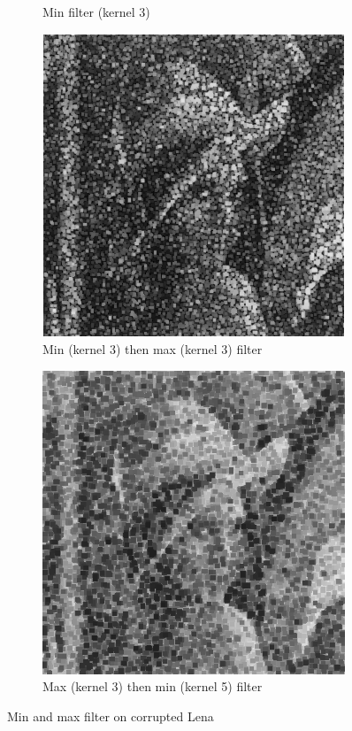 \documentclass{article}
\begin{document}
\begin{figure}[H]
\begin{subfigure}{0.4\textwidth}
		\caption{Min filter (kernel 3)}
	\end{subfigure}
	\begin{subfigure}{0.4\textwidth}
		\includegraphics[width=\textwidth]{Generated/Lena_corrupted_min3max3filter.png}
		\caption{Min (kernel 3) then max (kernel 3) filter}
	\end{subfigure}
	\hfill
	\begin{subfigure}{0.4\textwidth}
		\includegraphics[width=\textwidth]{Generated/Lena_corrupted_max3min5filter.png}
		\caption{Max (kernel 3) then min (kernel 5) filter}
	\end{subfigure}
	\caption{Min and max filter on corrupted Lena}
	\label{fig:min_max_Lena}
\end{figure}
\end{document}
